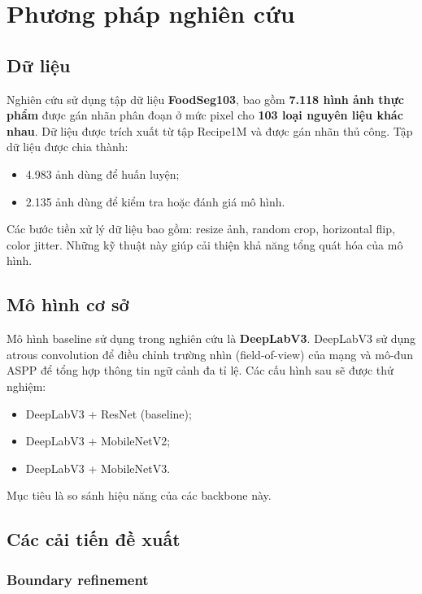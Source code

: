\section{Phương pháp nghiên cứu}
\label{method}

\subsection{Dữ liệu}

Nghiên cứu sử dụng tập dữ liệu \textbf{FoodSeg103}, bao gồm \textbf{7.118 hình ảnh thực phẩm} được gán nhãn phân đoạn ở mức pixel cho \textbf{103 loại nguyên liệu khác nhau}. Dữ liệu được trích xuất từ tập Recipe1M và được gán nhãn thủ công. Tập dữ liệu được chia thành:
\begin{itemize}
    \item 4.983 ảnh dùng để huấn luyện;
    \item 2.135 ảnh dùng để kiểm tra hoặc đánh giá mô hình.
\end{itemize}

Các bước tiền xử lý dữ liệu bao gồm: resize ảnh, random crop, horizontal flip, color jitter. Những kỹ thuật này giúp cải thiện khả năng tổng quát hóa của mô hình.

\subsection{Mô hình cơ sở}

Mô hình baseline sử dụng trong nghiên cứu là \textbf{DeepLabV3}. DeepLabV3 sử dụng atrous convolution để điều chỉnh trường nhìn (field-of-view) của mạng và mô-đun ASPP để tổng hợp thông tin ngữ cảnh đa tỉ lệ. Các cấu hình sau sẽ được thử nghiệm:
\begin{itemize}
    \item DeepLabV3 + ResNet (baseline);
    \item DeepLabV3 + MobileNetV2;
    \item DeepLabV3 + MobileNetV3.
\end{itemize}
Mục tiêu là so sánh hiệu năng của các backbone này.

\subsection{Các cải tiến đề xuất}

\subsubsection{Boundary refinement}

